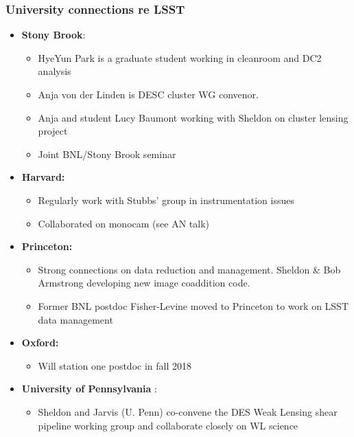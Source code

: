 \documentclass[aspectratio=169]{beamer}
\begin{document}
\begin{frame}
  \frametitle{University connections re LSST}

  \begin{itemize}


    \item \textbf{Stony Brook}:
        \begin{itemize}
            \item HyeYun Park is a graduate student working in cleanroom and
                DC2 analysis
            \item Anja von der Linden is DESC cluster WG convenor.
            \item Anja and student Lucy Baumont working with Sheldon on cluster lensing project
            \item Joint BNL/Stony Brook seminar
        \end{itemize}


    \item \textbf{Harvard:}
        \begin{itemize}
            \item Regularly work with Stubbs' group in instrumentation
                issues
            \item Collaborated on monocam (see AN talk)
        \end{itemize}

    \item \textbf{Princeton:}
        \begin{itemize}
            \item Strong connections on data reduction and management.  Sheldon
                \& Bob Armstrong developing new image coaddition code.
            \item Former BNL postdoc Fisher-Levine moved to Princeton to
                work on LSST data management
        \end{itemize}
    \item \textbf{Oxford:}
        \begin{itemize}
            \item Will station one postdoc in fall 2018
        \end{itemize}

    \item \textbf{University of Pennsylvania }:
        \begin{itemize}
            \item Sheldon and Jarvis (U. Penn) co-convene the DES Weak Lensing 
                shear pipeline working group and collaborate closely on WL science
        \end{itemize}


\end{itemize}
\end{frame}
\end{document}
